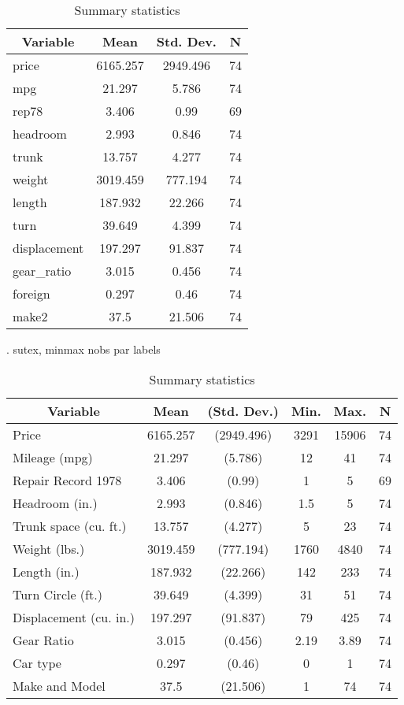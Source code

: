 \documentclass[12pt]{article}
\begin{document}
\begin{table}[htbp]\centering \caption{Summary statistics \label{sumstat}}
\begin{tabular}{l c c  c}\hline\hline
\multicolumn{1}{c}{\textbf{Variable}} & \textbf{Mean}
 & \textbf{Std. Dev.} & \textbf{N}\\ \hline
price & 6165.257 & 2949.496  & 74\\
mpg & 21.297 & 5.786  & 74\\
rep78 & 3.406 & 0.99  & 69\\
headroom & 2.993 & 0.846  & 74\\
trunk & 13.757 & 4.277  & 74\\
weight & 3019.459 & 777.194  & 74\\
length & 187.932 & 22.266  & 74\\
turn & 39.649 & 4.399  & 74\\
displacement & 197.297 & 91.837  & 74\\
gear\_ratio & 3.015 & 0.456  & 74\\
foreign & 0.297 & 0.46  & 74\\
make2 & 37.5 & 21.506  & 74\\
\hline
\end{tabular}
\end{table}


. sutex, minmax nobs par labels

\begin{table}[htbp]\centering \caption{Summary statistics \label{sumstat}}
\begin{tabular}{l c c c c c}\hline\hline
\multicolumn{1}{c}{\textbf{Variable}} & \textbf{Mean}
 & \textbf{(Std. Dev.)}& \textbf{Min.} &  \textbf{Max.} & \textbf{N}\\ \hline
Price & 6165.257 & (2949.496) & 3291 & 15906 & 74\\
Mileage (mpg) & 21.297 & (5.786) & 12 & 41 & 74\\
Repair Record 1978 & 3.406 & (0.99) & 1 & 5 & 69\\
Headroom (in.) & 2.993 & (0.846) & 1.5 & 5 & 74\\
Trunk space (cu. ft.) & 13.757 & (4.277) & 5 & 23 & 74\\
Weight (lbs.) & 3019.459 & (777.194) & 1760 & 4840 & 74\\
Length (in.) & 187.932 & (22.266) & 142 & 233 & 74\\
Turn Circle (ft.) & 39.649 & (4.399) & 31 & 51 & 74\\
Displacement (cu. in.) & 197.297 & (91.837) & 79 & 425 & 74\\
Gear Ratio & 3.015 & (0.456) & 2.19 & 3.89 & 74\\
Car type & 0.297 & (0.46) & 0 & 1 & 74\\
Make and Model & 37.5 & (21.506) & 1 & 74 & 74\\
\hline
\end{tabular}
\end{table}
\end{document}
